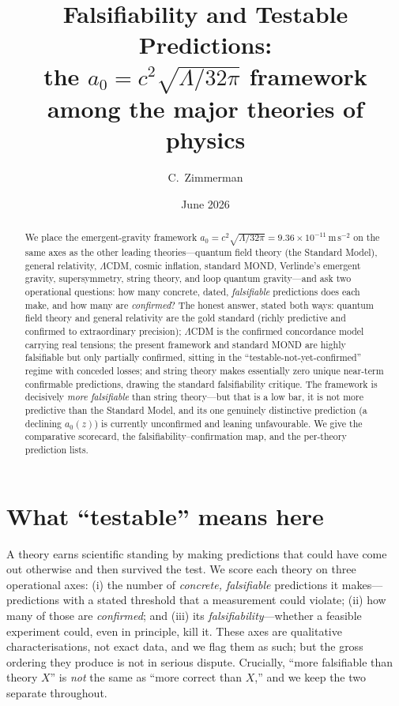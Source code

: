 \documentclass[aps,prd,twocolumn,10pt,nofootinbib]{revtex4-2}
\begin{document}
\title{Falsifiability and Testable Predictions:\\
the $a_0=c^2\sqrt{\Lambda/32\pi}$ framework among the major theories of physics}
\author{C.\ Zimmerman}
\date{June 2026}

\begin{abstract}
We place the emergent-gravity framework $a_0=c^2\sqrt{\Lambda/32\pi}=9.36\times10^{-11}\,\mathrm{m\,s^{-2}}$ on the
same axes as the other leading theories---quantum field theory (the Standard Model), general relativity,
$\Lambda$CDM, cosmic inflation, standard MOND, Verlinde's emergent gravity, supersymmetry, string theory, and loop
quantum gravity---and ask two operational questions: how many concrete, dated, \emph{falsifiable} predictions does
each make, and how many are \emph{confirmed}? The honest answer, stated both ways: quantum field theory and general
relativity are the gold standard (richly predictive and confirmed to extraordinary precision); $\Lambda$CDM is the
confirmed concordance model carrying real tensions; the present framework and standard MOND are highly falsifiable
but only partially confirmed, sitting in the ``testable-not-yet-confirmed'' regime with conceded losses; and string
theory makes essentially zero unique near-term confirmable predictions, drawing the standard falsifiability
critique. The framework is decisively \emph{more falsifiable} than string theory---but that is a low bar, it is not
more predictive than the Standard Model, and its one genuinely distinctive prediction (a declining $a_0(z)$) is
currently unconfirmed and leaning unfavourable. We give the comparative scorecard, the falsifiability--confirmation
map, and the per-theory prediction lists.
\end{abstract}

\maketitle

\section{What ``testable'' means here}
A theory earns scientific standing by making predictions that could have come out otherwise and then survived the
test. We score each theory on three operational axes: (i) the number of \emph{concrete, falsifiable} predictions it
makes---predictions with a stated threshold that a measurement could violate; (ii) how many of those are
\emph{confirmed}; and (iii) its \emph{falsifiability}---whether a feasible experiment could, even in principle, kill
it. These axes are qualitative characterisations, not exact data, and we flag them as such; but the gross ordering
they produce is not in serious dispute. Crucially, ``more falsifiable than theory $X$'' is \emph{not} the same as
``more correct than $X$,'' and we keep the two separate throughout.
\end{document}

